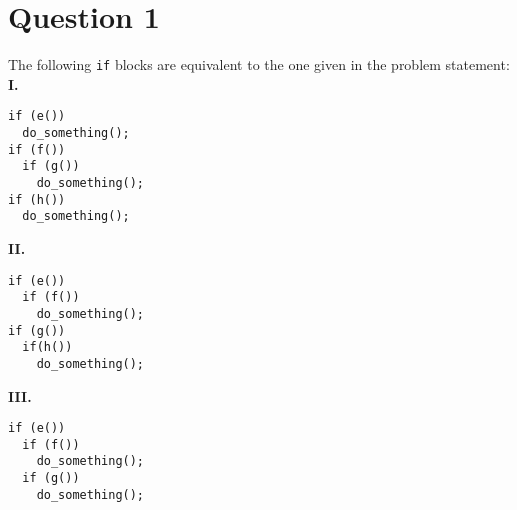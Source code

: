 \documentclass[13pt]{article}
\begin{document}
\section*{Question 1}
The following \texttt{if} blocks are equivalent to the one given in the problem statement: \\
\textbf{I.}
\begin{verbatim}
if (e())
  do_something();
if (f())
  if (g())
    do_something();
if (h())
  do_something();
\end{verbatim}
\textbf{II.}
\begin{verbatim}
if (e())
  if (f())
    do_something();
if (g())
  if(h())
    do_something();
\end{verbatim}
\textbf{III.}
\begin{verbatim}
if (e())
  if (f())
    do_something();
  if (g())
    do_something();
\end{verbatim}


\newpage
\end{document}
